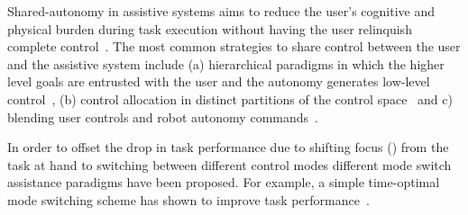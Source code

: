 Shared-autonomy in assistive systems aims to reduce the user's cognitive and physical burden during task execution without having the user relinquish complete control~\citep{philips2007adaptive,demeester2008user, gopinath2017human, muelling2017autonomy}. The most common strategies to share control between the user and the assistive system include (a) hierarchical paradigms in which the higher level goals are entrusted with the user and the autonomy generates low-level control~\citep{tsui2011want, kim2010relationship, kim2012autonomy}, (b) control allocation in distinct partitions of the control space~\citep{driessen2005collaborative} and c) blending user controls and robot autonomy commands~\citep{downey2016blending, storms2014blending, muelling2017autonomy}. 

In order to offset the drop in task performance due to shifting focus () from the task at hand to switching between different control modes different mode switch assistance paradigms have been proposed. For example, a simple time-optimal mode switching scheme has shown to improve task performance~\citep{herlant2016assistive, pilarski2012dynamic}. 

